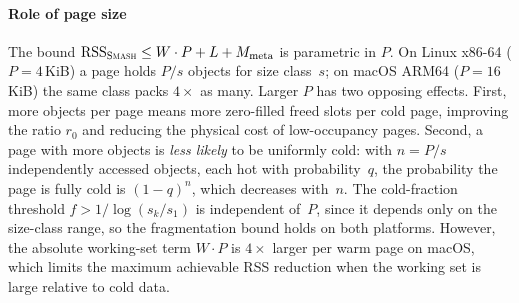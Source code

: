 \paragraph{Role of page size}
The bound $\text{RSS}_{\textsc{Smash}} \leq W \cdot P + L + M_{\text{meta}}$
is parametric in $P$.
On Linux x86-64 ($P = 4$\,KiB) a page holds $P/s$ objects for size
class~$s$; on macOS ARM64 ($P = 16$\,KiB) the same class packs
$4\times$ as many.
Larger $P$ has two opposing effects.
First, more objects per page means more zero-filled freed slots
per cold page, improving the ratio $r_0$ and reducing the physical
cost of low-occupancy pages.
Second, a page with more objects is \emph{less likely} to be
uniformly cold: with $n = P/s$ independently accessed objects, each
hot with probability~$q$, the probability the page is fully cold is
$(1-q)^n$, which decreases with~$n$.
The cold-fraction threshold $f > 1/\log(s_k/s_1)$ is independent
of~$P$, since it depends only on the size-class range, so the
fragmentation bound holds on both platforms.
However, the absolute working-set term $W \cdot P$ is $4\times$
larger per warm page on macOS, which limits the maximum achievable
RSS reduction when the working set is large relative to cold data.

